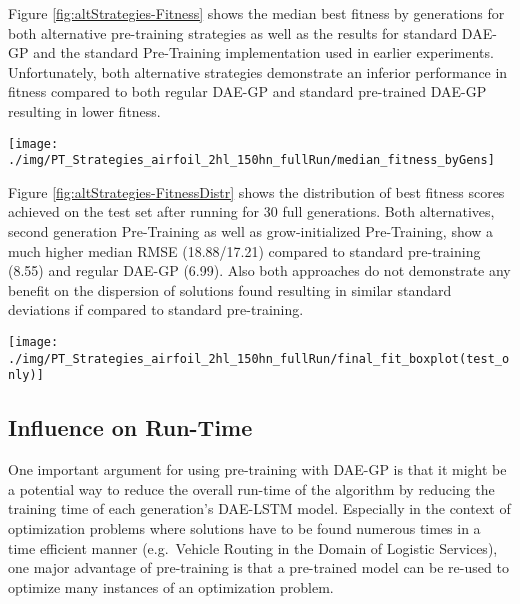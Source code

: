 \documentclass[
  11pt,
]{article}
\let\origfigure\figure
\let\endorigfigure\endfigure
\renewenvironment{figure}[1][2] {
    \expandafter\origfigure\expandafter[H]
} {
    \endorigfigure
}
\begin{document}
Figure \ref{fig:altStrategies-Fitness} shows the median best fitness by generations for both alternative pre-training strategies as well as the results for standard DAE-GP and the standard Pre-Training implementation used in earlier experiments.
Unfortunately, both alternative strategies demonstrate an inferior performance in fitness compared to both regular DAE-GP and standard pre-trained DAE-GP resulting in lower fitness.

\begin{figure}[c]

{\centering \texttt{[image: ./img/PT\_Strategies\_airfoil\_2hl\_150hn\_fullRun/median\_fitness\_byGens]} 

}

\caption{Best Fitness over 30 Generations - Airfoil - Alternative Pre-Training Strategies }\label{fig:altStrategies-Fitness}
\end{figure}

Figure \ref{fig:altStrategies-FitnessDistr} shows the distribution of best fitness scores achieved on the test set after running for 30 full generations.
Both alternatives, second generation Pre-Training as well as grow-initialized Pre-Training, show a much higher median RMSE (18.88/17.21) compared to standard pre-training (8.55) and regular DAE-GP (6.99).
Also both approaches do not demonstrate any benefit on the dispersion of solutions found resulting in similar standard deviations if compared to standard pre-training.

\begin{figure}[c]

{\centering \texttt{[image: ./img/PT\_Strategies\_airfoil\_2hl\_150hn\_fullRun/final\_fit\_boxplot(test\_only)]} 

}

\caption{Best Fitness on Test Set after 30 Generations - Airfoil - Alternative Pre-Training Strategies}\label{fig:altStrategies-FitnessDistr}
\end{figure}

\hypertarget{influence-on-run-time}{%
\subsection{Influence on Run-Time}\label{influence-on-run-time}}

One important argument for using pre-training with DAE-GP is that it might be a potential way to reduce the overall run-time of the algorithm by reducing the training time of each generation's DAE-LSTM model.
Especially in the context of optimization problems where solutions have to be found numerous times in a time efficient manner (e.g.~Vehicle Routing in the Domain of Logistic Services), one major advantage of pre-training is that a pre-trained model can be re-used to optimize many instances of an optimization problem.
\end{document}
